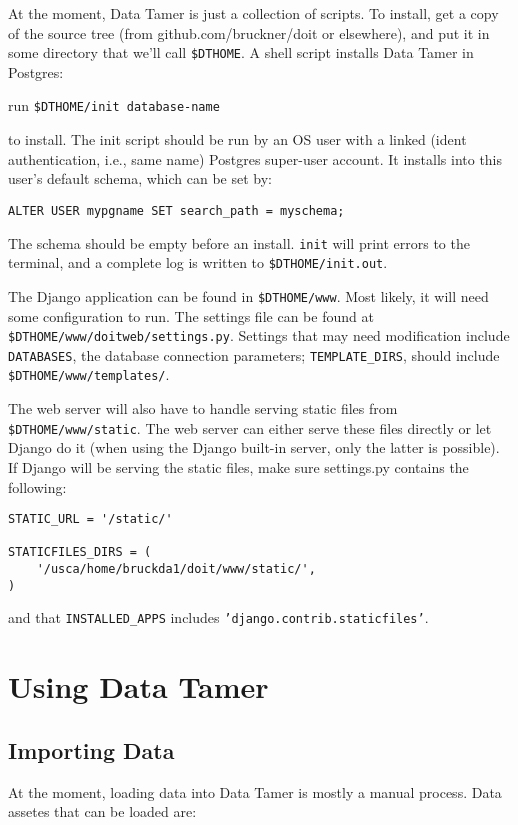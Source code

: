 At the moment, Data Tamer is just a collection of scripts.  To install, get a copy of the source tree (from github.com/bruckner/doit or elsewhere), and put it in some directory that we'll call \texttt{\$DTHOME}.  A shell script installs Data Tamer in Postgres:

run \texttt{\$DTHOME/init database-name}

to install.  The init script should be run by an OS user with a linked (ident authentication, i.e., same name) Postgres super-user account.  It installs into this user's default schema, which can be set by:

\texttt{ALTER USER mypgname SET search\_path = myschema;}

The schema should be empty before an install.  \texttt{init} will print errors to the terminal, and a complete log is written to \texttt{\$DTHOME/init.out}.

The Django application can be found in \texttt{\$DTHOME/www}.  Most likely, it will need some configuration to run.  The settings file can be found at \texttt{\$DTHOME/www/doitweb/settings.py}.  Settings that may need modification include \texttt{DATABASES}, the database connection parameters; \texttt{TEMPLATE\_DIRS}, should include \texttt{\$DTHOME/www/templates/}.

The web server will also have to handle serving static files from \texttt{\$DTHOME/www/static}.  The web server can either serve these files directly or let Django do it (when using the Django built-in server, only the latter is possible).  If Django will be serving the static files, make sure settings.py contains the following:

\begin{verbatim}
STATIC_URL = '/static/'

STATICFILES_DIRS = (
    '/usca/home/bruckda1/doit/www/static/',
)
\end{verbatim}

and that \texttt{INSTALLED\_APPS} includes \texttt{'django.contrib.staticfiles'}.


\section{Using Data Tamer}

\subsection{Importing Data}

At the moment, loading data into Data Tamer is mostly a manual process.  Data assetes that can be loaded are:

